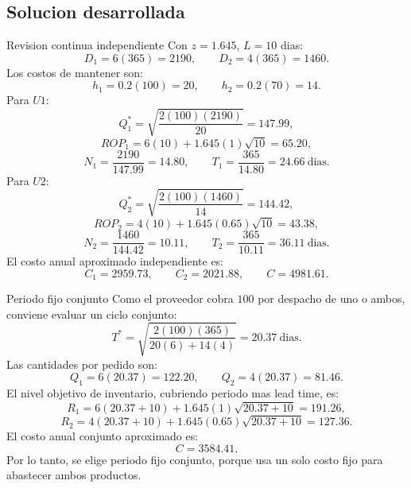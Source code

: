 \subsection{Solucion desarrollada}

\begin{respuesta}{Revision continua independiente}
Con \(z=1.645\), \(L=10\) dias:
\[
D_1=6(365)=2190,\qquad D_2=4(365)=1460.
\]
Los costos de mantener son:
\[
h_1=0.2(100)=20,\qquad h_2=0.2(70)=14.
\]
Para \(U1\):
\[
Q_1^*=\sqrt{\frac{2(100)(2190)}{20}}=147.99,
\]
\[
ROP_1=6(10)+1.645(1)\sqrt{10}=65.20,
\]
\[
N_1=\frac{2190}{147.99}=14.80,\qquad T_1=\frac{365}{14.80}=24.66\ \text{dias}.
\]
Para \(U2\):
\[
Q_2^*=\sqrt{\frac{2(100)(1460)}{14}}=144.42,
\]
\[
ROP_2=4(10)+1.645(0.65)\sqrt{10}=43.38,
\]
\[
N_2=\frac{1460}{144.42}=10.11,\qquad T_2=\frac{365}{10.11}=36.11\ \text{dias}.
\]
El costo anual aproximado independiente es:
\[
C_1=2959.73,\qquad C_2=2021.88,\qquad C=4981.61.
\]
\end{respuesta}

\begin{respuesta}{Periodo fijo conjunto}
Como el proveedor cobra \(100\) por despacho de uno o ambos, conviene evaluar un ciclo conjunto:
\[
T^*=\sqrt{\frac{2(100)(365)}{20(6)+14(4)}}=20.37\ \text{dias}.
\]
Las cantidades por pedido son:
\[
Q_1=6(20.37)=122.20,\qquad Q_2=4(20.37)=81.46.
\]
El nivel objetivo de inventario, cubriendo periodo mas lead time, es:
\[
R_1=6(20.37+10)+1.645(1)\sqrt{20.37+10}=191.26,
\]
\[
R_2=4(20.37+10)+1.645(0.65)\sqrt{20.37+10}=127.36.
\]
El costo anual conjunto aproximado es:
\[
C=3584.41.
\]
Por lo tanto, se elige periodo fijo conjunto, porque usa un solo costo fijo para abastecer ambos productos.
\end{respuesta}

